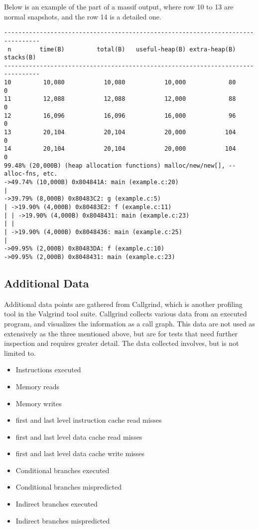 Below is an example of the part of a massif output, where row 10 to 13 are normal snapshots, and the row 14 is a detailed one.

\begin{lstlisting}[basicstyle=\footnotesize, caption={[Massif output example]Massif output example (massif documentation\protect\cite{massif_manual})}, label=lst:massif_output]
--------------------------------------------------------------------------------
 n        time(B)         total(B)   useful-heap(B) extra-heap(B)    stacks(B)
--------------------------------------------------------------------------------
10         10,080           10,080           10,000            80            0
11         12,088           12,088           12,000            88            0
12         16,096           16,096           16,000            96            0
13         20,104           20,104           20,000           104            0
14         20,104           20,104           20,000           104            0
99.48% (20,000B) (heap allocation functions) malloc/new/new[], --alloc-fns, etc.
->49.74% (10,000B) 0x804841A: main (example.c:20)
|
->39.79% (8,000B) 0x80483C2: g (example.c:5)
| ->19.90% (4,000B) 0x80483E2: f (example.c:11)
| | ->19.90% (4,000B) 0x8048431: main (example.c:23)
| |
| ->19.90% (4,000B) 0x8048436: main (example.c:25)
|
->09.95% (2,000B) 0x80483DA: f (example.c:10)
->09.95% (2,000B) 0x8048431: main (example.c:23)
\end{lstlisting}

\subsection{Additional Data}
\label{subsec:measurements_callgrind}
Additional data points are gathered from Callgrind\cite{callgrind_manual}, which is another profiling tool in the Valgrind tool suite.
Callgrind collects various data from an executed program, and visualizes the information as a call graph.
This data are not used as extensively as the three mentioned above,
but are for tests that need further inspection and requires greater detail.
The data collected involves, but is not limited to.

\begin{itemize}
    \item Instructions executed
    \item Memory reads
    \item Memory writes
    \item first and last level instruction cache read misses
    \item first and last level data cache read misses
    \item first and last level data cache write misses
    \item Conditional branches executed
    \item Conditional branches mispredicted
    \item Indirect branches executed
    \item Indirect branches mispredicted
\end{itemize}

